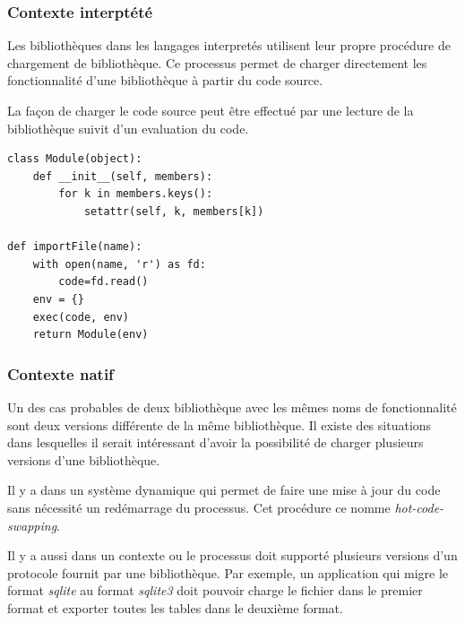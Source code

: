\documentclass[12pt,initial,twoside,maitrise]{dms}
\numberwithin{equation}{section}
\numberwithin{table}{chapter}
\numberwithin{figure}{chapter}
\begin{document}
\subsubsection{Contexte interptété}
Les bibliothèques dans les langages interpretés utilisent leur propre procédure
de chargement de bibliothèque. Ce processus permet de charger directement les
fonctionnalité d'une bibliothèque à partir du code source.

La façon de charger le code source peut être effectué par une lecture de la
bibliothèque suivit d'un evaluation du code.

\begin{verbatim}
class Module(object):
    def __init__(self, members):
        for k in members.keys():
            setattr(self, k, members[k])

def importFile(name):
    with open(name, 'r') as fd:
        code=fd.read()
    env = {}
    exec(code, env)
    return Module(env)

\end{verbatim}

\subsubsection{Contexte natif}

Un des cas probables de deux bibliothèque avec les mêmes noms de fonctionnalité
sont deux versions différente de la même bibliothèque. Il existe des situations
dans lesquelles il serait intéressant d'avoir la possibilité de charger plusieurs
versions d'une bibliothèque.

Il y a dans un système dynamique qui permet de faire une mise à jour du
code sans nécessité un redémarrage du processus. Cet procédure ce nomme
\textit{hot-code-swapping}.

Il y a aussi dans un contexte ou le processus doit supporté plusieurs versions
d'un protocole fournit par une bibliothèque. Par exemple, un application qui migre
le format \textit{sqlite} au format \textit{sqlite3} doit pouvoir charge le fichier
dans le premier format et exporter toutes les tables dans le deuxième format.

\newpage

\end{document}
